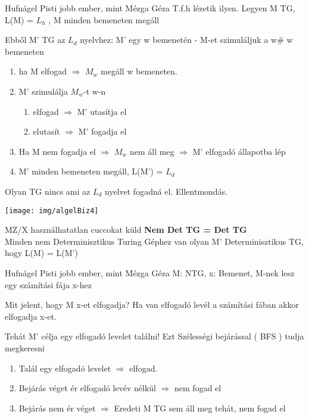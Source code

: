 \begin{bizonyitas}{Hufnágel Pisti jobb ember, mint Mézga Géza}
 T.f.h lézetik ilyen. Legyen M TG, L(M) = $L_h$ , M minden bemeneten megáll

	 Ebből M' TG az $L_d$ nyelvhez: M' egy w bemenetén - M-et szimuláljuk a w\# w bemeneten
	 \begin{enumerate}[itemsep=0 mm]
	 	 \item ha M elfogad $\Rightarrow$  $M_w$ megáll w bemeneten.
	 	 \item M' szimulálja $M_w$-t w-n
	 	 	\begin{enumerate}[itemsep=0 mm]
			 	 \item elfogad $\Rightarrow$ M' utasítja el
			 	 \item elutasít $\Rightarrow$ M' fogadja el
			 \end{enumerate}
		\item Ha M nem fogadja el $\Rightarrow$ $M_w$ nem áll meg $\Rightarrow$ M' elfogadó állapotba lép
		\item M' minden bemeneten megáll, L(M') = $L_d$
	 \end{enumerate}

	 Olyan TG nincs ami az $L_d$ nyelvet fogadná el. Ellentmondás.

	 \begin{center}
  	 \texttt{[image: img/algelBiz4]}
  \end{center}
\end{bizonyitas}


	 \begin{tetel}{MZ/X használhatatlan cuccokat küld}
    \textbf{Nem Det TG = Det TG}\\[3pt]
	 Minden nem Determinisztikus Turing Géphez van olyan M' Determinisztikus TG, hogy L(M) = L(M')\\[4pt]
   \end{tetel}

\begin{bizonyitas}{Hufnágel Pisti jobb ember, mint Mézga Géza}
 M: NTG, x: Bemenet, M-nek lesz egy számítási fája x-hez

	Mit jelent, hogy M x-et elfogadja? Ha van elfogadó levél a számítási fában akkor elfogadja x-et.

	Tehát M' célja egy elfogadó levelet találni! Ezt Szélességi bejárással ( BFS ) tudja megkeresni
	\begin{enumerate}[itemsep=0mm]
		\item Talál egy elfogadó levelet $\Rightarrow$ elfogad.
		\item Bejárás véget ér elfogadó levév nélkül $\Rightarrow$ nem fogad el
		\item Bejárás nem ér véget $\Rightarrow$ Eredeti M TG sem áll meg tehát, nem fogad el
	\end{enumerate}
\end{bizonyitas}
